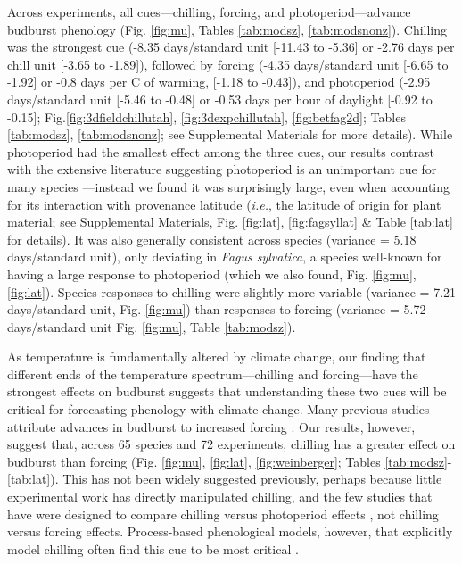 \documentclass{article}
\begin{document}
\par Across experiments, all cues---chilling, forcing, and photoperiod---advance budburst phenology (Fig. \ref{fig:mu}, Tables \ref{tab:modsz}, \ref{tab:modsnonz}). Chilling was the strongest cue (-8.35 days/standard unit [-11.43 to -5.36] or -2.76 days per chill unit [-3.65 to -1.89]), followed by forcing (-4.35 days/standard unit [-6.65 to -1.92] or -0.8 days per \degree C of warming, [-1.18 to -0.43]), and photoperiod (-2.95 days/standard unit [-5.46 to -0.48] or -0.53 days per hour of daylight [-0.92 to -0.15]; Fig.\ref{fig:3dfieldchillutah}, \ref{fig:3dexpchillutah}, \ref{fig:betfag2d}; Tables \ref{tab:modsz}, \ref{tab:modsnonz}; see Supplemental Materials for more details). While photoperiod had the smallest effect among the three cues, our results contrast with the extensive literature suggesting photoperiod is an unimportant cue for many species \emph{\citep{zohner2016,fu2019}}---instead we found it was surprisingly large, even when accounting for its interaction with provenance latitude (\emph{i.e.}, the latitude of origin for plant material; see Supplemental Materials, Fig. \ref{fig:lat}, \ref{fig:fagsyllat} \& Table \ref{tab:lat} for details). It was also generally consistent across species (variance = 5.18 days/standard unit), only deviating in \emph{Fagus sylvatica}, a species well-known for having a large response to photoperiod (which we also found, Fig. \ref{fig:mu}, \ref{fig:lat}). Species responses to chilling were slightly more variable (variance = 7.21 days/standard unit, Fig. \ref{fig:mu}) than responses to forcing (variance = 5.72 days/standard unit Fig. \ref{fig:mu}, Table \ref{tab:modsz}). 

\par As temperature is fundamentally altered by climate change, our finding that different ends of the temperature spectrum---chilling and forcing---have the strongest effects on budburst suggests that understanding these two cues will be critical for forecasting phenology with climate change. Many previous studies attribute advances in budburst to increased forcing \emph{\citep{menzel2006,harrington2015,Basler:2014aa,bradley1999}}. Our results, however, suggest that, across 65 species and 72 experiments, chilling has a greater effect on budburst than forcing (Fig. \ref{fig:mu}, \ref{fig:lat}, \ref{fig:weinberger}; Tables \ref{tab:modsz}-\ref{tab:lat}). This has not been widely suggested previously, perhaps because little experimental work has directly manipulated chilling, and the few studies that have were designed to compare chilling versus photoperiod effects \emph{\citep[e.g.,][]{zohner2016,Basler:2014aa,Caffarra:2011qf,Laube:2014a}}, not chilling versus forcing effects. Process-based phenological models, however, that explicitly model chilling often find this cue to be most critical \emph{\citep[e.g.,][]{Laube:2014a,gauzere2019,Heide:2005aa}}.
\end{document}
